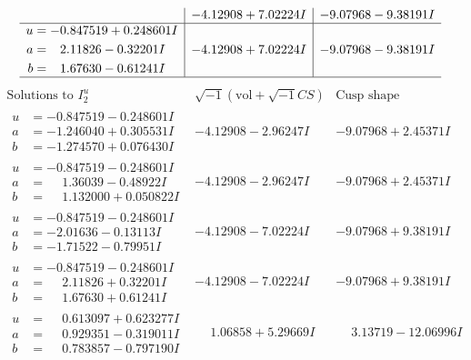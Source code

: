 \documentclass[1p]{elsarticle_modified}
\theoremstyle{definition}
\newcommand{\I}{\sqrt{-1}}
\begin{document}
$$\begin{array}{c|c|c}
 & -4.12908 + 7.02224 I & -9.07968 - 9.38191 I \\ \hline\begin{aligned}
u &= -0.847519 + 0.248601 I \\
a &= \phantom{-}2.11826 - 0.32201 I \\
b &= \phantom{-}1.67630 - 0.61241 I\end{aligned}
 & -4.12908 + 7.02224 I & -9.07968 - 9.38191 I\\
 \hline 
 \end{array}$$\newpage$$\begin{array}{c|c|c}  
\text{Solutions to }I^u_{2}& \I (\text{vol} + \sqrt{-1}CS) & \text{Cusp shape}\\
 \hline 
\begin{aligned}
u &= -0.847519 - 0.248601 I \\
a &= -1.246040 + 0.305531 I \\
b &= -1.274570 + 0.076430 I\end{aligned}
 & -4.12908 - 2.96247 I & -9.07968 + 2.45371 I \\ \hline\begin{aligned}
u &= -0.847519 - 0.248601 I \\
a &= \phantom{-}1.36039 - 0.48922 I \\
b &= \phantom{-}1.132000 + 0.050822 I\end{aligned}
 & -4.12908 - 2.96247 I & -9.07968 + 2.45371 I \\ \hline\begin{aligned}
u &= -0.847519 - 0.248601 I \\
a &= -2.01636 - 0.13113 I \\
b &= -1.71522 - 0.79951 I\end{aligned}
 & -4.12908 - 7.02224 I & -9.07968 + 9.38191 I \\ \hline\begin{aligned}
u &= -0.847519 - 0.248601 I \\
a &= \phantom{-}2.11826 + 0.32201 I \\
b &= \phantom{-}1.67630 + 0.61241 I\end{aligned}
 & -4.12908 - 7.02224 I & -9.07968 + 9.38191 I \\ \hline\begin{aligned}
u &= \phantom{-}0.613097 + 0.623277 I \\
a &= \phantom{-}0.929351 - 0.319011 I \\
b &= \phantom{-}0.783857 - 0.797190 I\end{aligned}
 & \phantom{-}1.06858 + 5.29669 I & \phantom{-}3.13719 - 12.06996 I \\ \hline\begin{aligned}

\end{aligned}
\end{array}$$
\end{document}
